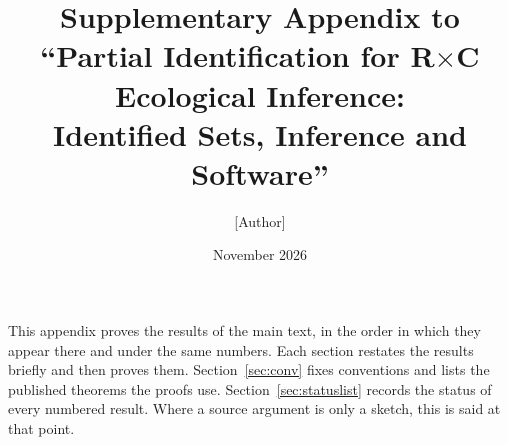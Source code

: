 \documentclass[11pt]{article}
\title{Supplementary Appendix to\\ ``Partial Identification for R$\times$C Ecological Inference:\\
Identified Sets, Inference and Software''}
\author{[Author]}
\date{November 2026}
\begin{document}
\maketitle

\noindent This appendix proves the results of the main text, in the order in which
they appear there and under the same numbers. Each section restates the results
briefly and then proves them. Section~\ref{sec:conv} fixes conventions and lists the
published theorems the proofs use. Section~\ref{sec:statuslist} records the status
of every numbered result. Where a source argument is only a sketch, this is said
at that point.

\tableofcontents










\end{document}
